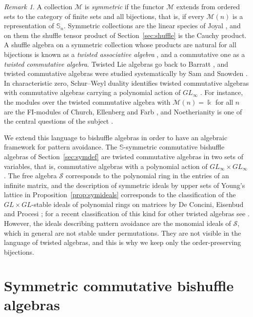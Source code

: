 \documentclass[11pt]{amsart}
\theoremstyle{definition}
\theoremstyle{remark}
\newtheorem{remark}[theorem]{Remark}
\newcommand{\bS}{\mathbb{S}}
\newcommand{\kk}{\Bbbk}
\newcommand{\cM}{\mathscr{M}}
\newcommand{\cS}{\mathscr{S}}
\begin{document}
\begin{remark}\label{rem:twisted}
A collection $\cM$ is \emph{symmetric} if the functor $\cM$ extends from ordered sets to the category of finite sets and all bijections, that is, if every $\cM(n)$ is a representation of $\bS_n$. Symmetric collections are the linear species of Joyal \cite{Joyal,AM}, and on them the shuffle tensor product of Section~\ref{sec:shuffle} is the Cauchy product. A shuffle algebra on a symmetric collection whose products are natural for all bijections is known as a \emph{twisted associative algebra} \cite{Dotsenko}, and a commutative one as a \emph{twisted commutative algebra}. Twisted Lie algebras go back to Barratt \cite{Barratt}, and twisted commutative algebras were studied systematically by Sam and Snowden \cite{SS-tca,SS-GL,SS}. In characteristic zero, Schur--Weyl duality identifies twisted commutative algebras with commutative algebras carrying a polynomial action of $GL_\infty$ \cite{SS-tca}. For instance, the modules over the twisted commutative algebra with $\cM(n)=\kk$ for all $n$ are the FI-modules of Church, Ellenberg and Farb \cite{CEF,SS-tca}, and Noetherianity is one of the central questions of the subject \cite{SS-tca,NSS}.

We extend this language to bishuffle algebras in order to have an algebraic framework for pattern avoidance. The $\bS$-symmetric commutative bishuffle algebras of Section~\ref{sec:symdef} are twisted commutative algebras in two sets of variables, that is, commutative algebras with a polynomial action of $GL_\infty\times GL_\infty$ \cite{SS-tca}. The free algebra $\cS$ corresponds to the polynomial ring in the entries of an infinite matrix, and the description of symmetric ideals by upper sets of Young's lattice in Proposition~\ref{prop:symideals} corresponds to the classification of the $GL\times GL$-stable ideals of polynomial rings on matrices by De Concini, Eisenbud and Procesi \cite{DCEP}; for a recent classification of this kind for other twisted algebras see \cite{DL}. However, the ideals describing pattern avoidance are the monomial ideals of $\cS$, which in general are not stable under permutations. They are not visible in the language of twisted algebras, and this is why we keep only the order-preserving bijections.
\end{remark}

\section{Symmetric commutative bishuffle algebras}\label{sec:examples}
\end{document}
